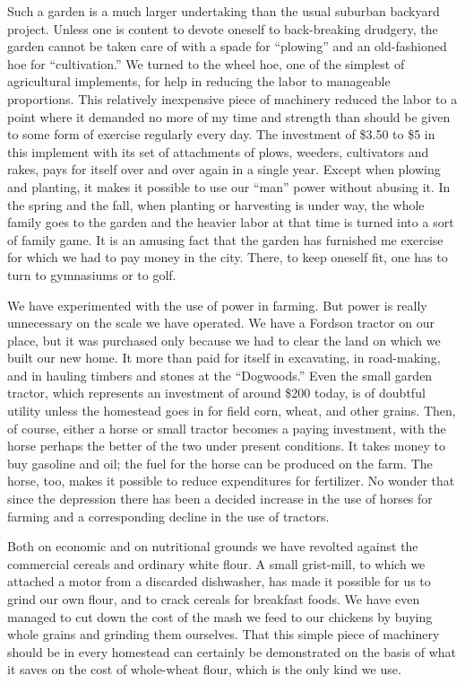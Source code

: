 \documentclass{book}
\begin{document}
Such a garden is a much larger undertaking than the usual suburban backyard project. Unless one is content to devote oneself to back-breaking drudgery, the garden cannot be taken care of with a spade for “plowing” and an old-fashioned hoe for “cultivation.” We turned to the wheel hoe, one of the simplest of agricultural implements, for help in reducing the labor to manageable proportions. This relatively inexpensive piece of machinery reduced the labor to a point where it demanded no more of my time and strength than should be given to some form of exercise regularly every day. The investment of \$3.50 to \$5 in this implement with its set of attachments of plows, weeders, cultivators and rakes, pays for itself over and over again in a single year. Except when plowing and planting, it makes it possible to use our “man” power without abusing it. In the spring and the fall, when planting or harvesting is under way, the whole family goes to the garden and the heavier labor at that time is turned into a sort of family game. It is an amusing fact that the garden has furnished me exercise for which we had to pay money in the city. There, to keep oneself fit, one has to turn to gymnasiums or to golf.

We have experimented with the use of power in farming. But power is really unnecessary on the scale we have operated. We have a Fordson tractor on our place, but it was purchased only because we had to clear the land on which we built our new home. It more than paid for itself in excavating, in road-making, and in hauling timbers and stones at the “Dogwoods.” Even the small garden tractor, which represents an investment of around \$200 today, is of doubtful utility unless the homestead goes in for field corn, wheat, and other grains. Then, of course, either a horse or small tractor becomes a paying investment, with the horse perhaps the better of the two under present conditions. It takes money to buy gasoline and oil; the fuel for the horse can be produced on the farm. The horse, too, makes it possible to reduce expenditures for fertilizer. No wonder that since the depression there has been a decided increase in the use of horses for farming and a corresponding decline in the use of tractors.

Both on economic and on nutritional grounds we have revolted against the commercial cereals and ordinary white flour. A small grist-mill, to which we attached a motor from a discarded dishwasher, has made it possible for us to grind our own flour, and to crack cereals for breakfast foods. We have even managed to cut down the cost of the mash we feed to our chickens by buying whole grains and grinding them ourselves. That this simple piece of machinery should be in every homestead can certainly be demonstrated on the basis of what it saves on the cost of whole-wheat flour, which is the only kind we use.
\end{document}
